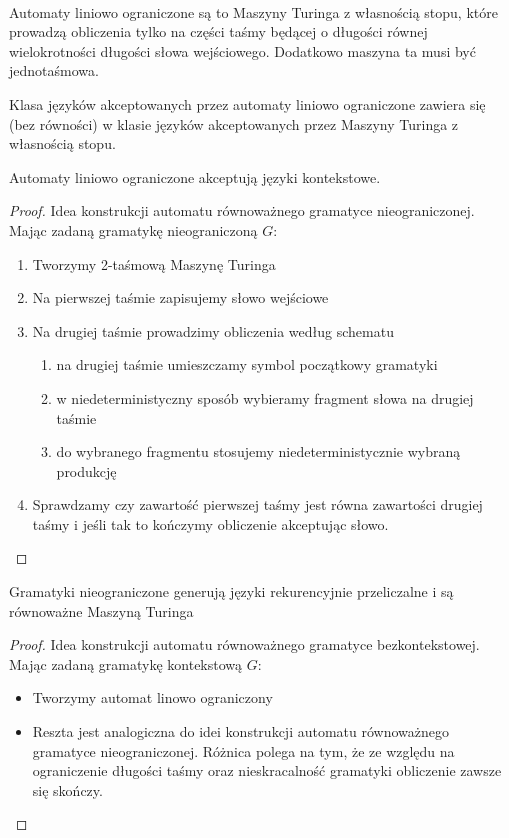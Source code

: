 \begin{df}~\\
	Automaty liniowo ograniczone są to Maszyny Turinga z własnością stopu, które prowadzą obliczenia
	tylko na części taśmy będącej o długości równej wielokrotności długości słowa wejściowego.
	Dodatkowo maszyna ta musi być jednotaśmowa.
\end{df}

\begin{tw}
	Klasa języków akceptowanych przez automaty liniowo ograniczone zawiera się (bez równości) w
	klasie języków akceptowanych przez Maszyny Turinga z własnością stopu.
\end{tw}

\begin{tw}
	Automaty liniowo ograniczone akceptują języki kontekstowe.
	\begin{proof}
		Idea konstrukcji automatu równoważnego gramatyce nieograniczonej.
		Mając zadaną gramatykę nieograniczoną $G$:
		\begin{enumerate}
			\item Tworzymy 2-taśmową Maszynę Turinga
			\item Na pierwszej taśmie zapisujemy słowo wejściowe
			\item Na drugiej taśmie prowadzimy obliczenia według schematu
				\begin{enumerate}
					\item na drugiej taśmie umieszczamy symbol początkowy gramatyki
					\item w niedeterministyczny sposób wybieramy fragment słowa na drugiej taśmie
					\item do wybranego fragmentu stosujemy niedeterministycznie wybraną produkcję
				\end{enumerate}
			\item Sprawdzamy czy zawartość pierwszej taśmy jest równa zawartości drugiej taśmy i 
			jeśli tak to kończymy obliczenie akceptując słowo.
		\end{enumerate}
	\end{proof}
\end{tw}

\begin{tw}
	Gramatyki nieograniczone generują języki rekurencyjnie przeliczalne i są równoważne Maszyną Turinga
	\begin{proof}
		Idea konstrukcji automatu równoważnego gramatyce bezkontekstowej.
		Mając zadaną gramatykę kontekstową $G$:
		\begin{itemize}
			\item Tworzymy automat linowo ograniczony
			\item Reszta jest analogiczna do idei konstrukcji automatu równoważnego gramatyce
			nieograniczonej. Różnica polega na tym, że ze względu na ograniczenie długości
			taśmy oraz nieskracalność gramatyki obliczenie zawsze się skończy.
		\end{itemize}
	\end{proof}
\end{tw}

